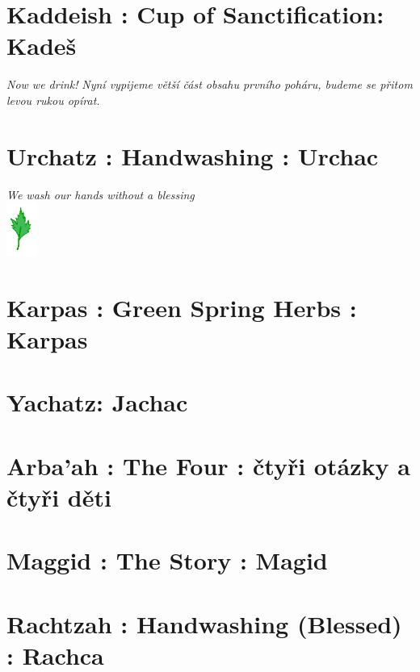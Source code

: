 \documentclass[a5paper,10pt]{memoir}
\begin{document}
\section{Kaddeish : Cup of Sanctification: Kadeš}
\begin{paracol}{2}
\end{paracol}
\Kaddeish
{}
\Shehechyanu
\textit{Now we drink!}
\textit{Nyní  vypijeme větší část obsahu prvního poháru, budeme se přitom levou rukou opírat.}

\section{Urchatz : Handwashing : Urchac}
\textit{We wash our hands without a blessing}
% 
\\
\vspace*{8ex}
\hfill\includegraphics[width=10mm]{Karpas}
\vspace*{-20ex}  %
\section{Karpas : Green Spring Herbs : Karpas}
 \Karpas

\section{Yachatz: Jachac}
\Yachatz

\section{Arba'ah : The Four : čtyři otázky a čtyři děti}
\MaNishtana
\FourChildrenText
%
\section{Maggid : The Story : Magid}
\MaggidIntro
\Plagues
\Dayyeinu

\section{Rachtzah : Handwashing (Blessed) : Rachca}
\Handwashing
\end{document}
